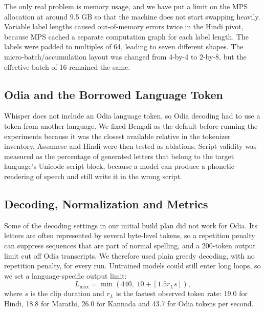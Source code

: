 \documentclass[conference]{IEEEtran}
\begin{document}
The only real problem is memory usage, and we have put a limit on the MPS allocation at around 9.5 GB so that the machine does not start swapping heavily. Variable label lengths caused out-of-memory errors twice in the Hindi pivot, because MPS cached a separate computation graph for each label length. The labels were padded to multiples of 64, leading to seven different shapes. The micro-batch/accumulation layout was changed from 4-by-4 to 2-by-8, but the effective batch of 16 remained the same.

\subsection{Odia and the Borrowed Language Token}

Whisper does not include an Odia language token, so Odia decoding had
to use a token from another language. We fixed Bengali as the default
before running the experiments because it was the closest available
relative in the tokenizer inventory. Assamese and Hindi were then tested
as ablations. Script validity was measured as the percentage of
generated letters that belong to the target language's Unicode script
block, because a model can produce a phonetic rendering of speech and
still write it in the wrong script.

\subsection{Decoding, Normalization and Metrics}

Some of the decoding settings in our initial build plan did not work
for Odia. Its letters are often represented by several byte-level
tokens, so a repetition penalty can suppress sequences that are part of
normal spelling, and a 200-token output limit cut off Odia transcripts.
We therefore used plain greedy decoding, with no repetition penalty,
for every run. Untrained models could still enter long loops, so we
set a language-specific output limit:
\begin{equation*}
L_{\max}=\min\left(440,\;10+\left\lceil1.5r_Ls\right\rceil\right),
\end{equation*}
where $s$ is the clip duration and $r_L$ is the fastest observed token
rate: 19.0 for Hindi, 18.8 for Marathi, 26.0 for Kannada and 43.7 for
Odia tokens per second.
\end{document}

